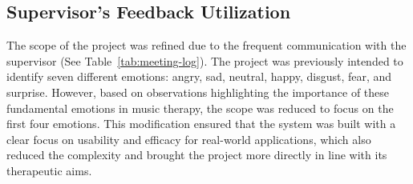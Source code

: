 \subsection{Supervisor's Feedback Utilization}
The scope of the project was refined due to the frequent communication with the supervisor (See Table~\ref{tab:meeting-log}). 
The project was previously intended to identify seven different emotions: angry, sad, neutral, happy, disgust, fear, and surprise.
However, based on observations highlighting the importance of these fundamental emotions in music therapy, the scope was reduced to focus on the first four emotions.
This modification ensured that the system was built with a clear focus on usability and efficacy for real-world applications, which also reduced the complexity and brought the project more directly in line with its therapeutic aims.
